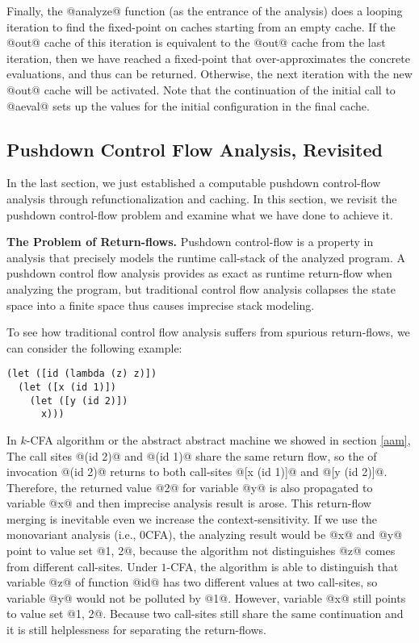 \documentclass[acmsmall,review,anonymous]{acmart}\settopmatter{printfolios=true,printccs=false,printacmref=false}
\begin{document}
Finally, the @analyze@ function (as the entrance of the analysis) does a looping iteration
to find the fixed-point on caches starting from an empty cache.
If the @out@ cache of this iteration is equivalent to the @out@ cache from the last iteration,
then we have reached a fixed-point that over-approximates the concrete evaluations,
and thus can be returned.
Otherwise, the next iteration with the new @out@ cache will be activated.
Note that the continuation of the initial call to @aeval@ sets up the values for the
initial configuration in the final cache.

\subsection{Pushdown Control Flow Analysis, Revisited} \label{pdcfarevisit}

In the last section, we just established a computable pushdown control-flow
analysis through refunctionalization and caching. In this section,
we revisit the pushdown control-flow problem and examine what we have done to
achieve it.

\textbf{The Problem of Return-flows.}
Pushdown control-flow is a property in analysis that precisely models
the runtime call-stack of the analyzed program.
A pushdown control flow analysis provides as exact as runtime return-flow
when analyzing the program, but traditional control flow analysis collapses
the state space into a finite space thus causes imprecise stack modeling.

To see how traditional control flow analysis suffers from spurious return-flows,
we can consider the following example:

\begin{lstlisting}
(let ([id (lambda (z) z)])
  (let ([x (id 1)])
    (let ([y (id 2)])
      x)))
\end{lstlisting}

In $k$-CFA algorithm or the abstract abstract machine we showed in section
\ref{aam},
The call sites @(id 2)@ and @(id 1)@ share the same return flow,
so the of invocation @(id 2)@ returns to both call-sites @[x (id 1)]@ and @[y (id 2)]@.
Therefore, the returned value @2@ for variable @y@ is also propagated to
variable @x@ and then imprecise analysis result is arose.
This return-flow merging is inevitable even we increase the context-sensitivity.
If we use the monovariant analysis (i.e., 0CFA), the analyzing result would be @x@ and
@y@ point to value set @{1, 2}@, because the algorithm not distinguishes
@z@ comes from different call-sites.
Under $1$-CFA, the algorithm is able to distinguish that variable @z@ of function
@id@ has two different values at two call-sites, so variable @y@
would not be polluted by @1@.
However, variable @x@ still points to value set @{1, 2}@.
Because two call-sites still share the same continuation and
it is still helplessness for separating the return-flows.
\end{document}
